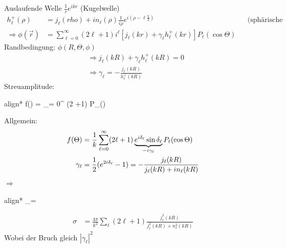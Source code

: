 	Auslaufende Welle $ %
	\frac{1}{r} e^{ikr}$ (Kugelwelle)
		\begin{align*}
			h_\ell^+ (\rho) &= j_\ell (rho) + in_\ell(\rho) %
			\frac{1}{i\rho} e^{i(\rho-\ell\frac{\pi}{2})} &
			&\text{(sphärische Hantelfunktion 1ter Art)} \\
			\Rightarrow \phi (\vec{r}) &= \sum_{\ell=0}^{\infty} (2 \ell +1) i^\ell
			\left[ j_\ell (kr) +\gamma_\ell h^+_\ell (kr)
			\right] P_\ell (\cos \Theta)
		\end{align*}
	Randbedingung: $\phi (R, \Theta, \phi)$
		\begin{align*}
			&\Rightarrow j_\ell (kR) + \gamma_\ell h_\ell^+(kR) = 0\\
			&\Rightarrow \gamma_\ell = -\frac{j_\ell(kR)}{h_\ell^+ (kR)}
		\end{align*}
	Streuamplitude:
		\begin{empheq}[box=\boxed]{align*}
			f(\Theta) = \sum_{\ell = 0}^{\infty} (2 \ell +1)  P_\ell(\cos \Theta)
		\end{empheq}
	Allgemein:
		\begin{align*}
			f(\Theta) &= \frac{1}{k} \sum_{\ell = 0}^{\infty}
			(2 \ell + 1) \underbrace{e^{i\delta_\ell} \sin \delta_\ell}_{\mathclap{-i \gamma_\ell}}
			P_\ell (\cos \Theta) \\
			\gamma_\ell &= \frac{1}{2} (e^{2i\delta_\ell} - 1)
			= -\frac{j_\ell(kR)}{j_\ell(kR)+ in_\ell (kR)}
		\end{align*}
		$\Rightarrow$
		\begin{empheq}[box=\boxed]{align*}
			\tan \delta_\ell = \frac{j_\ell (kR)}{n_\ell (kR)}
		\end{empheq}
		\begin{align*}
			\sigma &= \frac{4 \pi}{k^2} \sum_{\ell} (2\ell +1) 
			\frac{j_\ell^2 (kR)}{j_\ell^2 (kR)+ n_\ell^2 (kR)}
		\end{align*}
	Wobei der Bruch gleich $|\gamma_\ell|^2$
	
